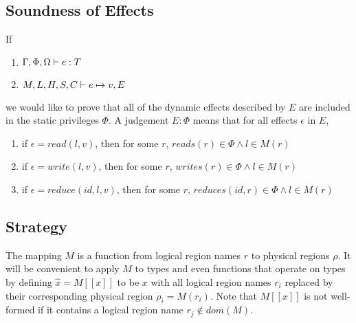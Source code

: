 \subsection{Soundness of Effects}

If
\begin{enumerate}
\item $\Gamma, \Phi, \Omega \vdash e : T$
\item $M, L, H, S, C \vdash e \mapsto v, E$
\end{enumerate}
we would like to prove that all of the dynamic effects described by $E$ are
included in the static privileges $\Phi$.  A judgement $E : \Phi$ means that
for all effects $\epsilon$ in $E$,
\begin{enumerate}
\item if $\epsilon = read(l, v)$, then for some $r$, $reads(r) \in \Phi \wedge l \in M(r)$
\item if $\epsilon = write(l, v)$, then for some $r$, $writes(r) \in \Phi \wedge l \in M(r)$
\item if $\epsilon = reduce(id, l, v)$, then for some $r$, $reduces(id,r) \in \Phi \wedge l \in M(r)$
\end{enumerate}

\subsection{Strategy}

\newcommand{\llbracket}{[\![}
\newcommand{\rrbracket}{]\!]}

The mapping $M$ is a function from logical region names $r$ to physical regions $\rho$.  It will
be convenient to apply $M$ to types and even functions that operate on types by defining
$\hat x = M \llbracket x \rrbracket$ to be $x$ with all logical region names $r_i$ replaced by their
corresponding physical region $\rho_i = M(r_i)$.  Note that $M \llbracket x \rrbracket$ is not
well-formed if it contains a logical region name $r_j \not\in dom(M)$. \\

